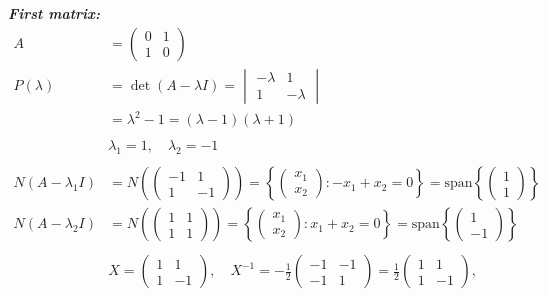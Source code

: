 \documentclass{article}
\begin{document}
\newpage
\noindent\textbf{\textit{First matrix:}}
\begin{align*}
    A &= \begin{pmatrix} 0 & 1 \\ 1 & 0 \end{pmatrix} \\
    P(\lambda) &= \det(A - \lambda I) = \begin{vmatrix} -\lambda & 1 \\ 1 & -\lambda \end{vmatrix} \\
    &= \lambda^2 - 1 = (\lambda - 1)(\lambda + 1) \\
    \\
    &\lambda_1 = 1, \quad \lambda_2 = -1 \\
    \\
    N(A - \lambda_1 I) &= N\left(\begin{pmatrix} -1 & 1 \\ 1 & -1 \end{pmatrix}\right)
    = \left\{ \begin{pmatrix} x_1 \\ x_2 \end{pmatrix} : -x_1 + x_2 = 0 \right\}
    = \text{span}\left\{ \begin{pmatrix} 1 \\ 1 \end{pmatrix} \right\} \\
    N(A - \lambda_2 I) &= N\left(\begin{pmatrix} 1 & 1 \\ 1 & 1 \end{pmatrix}\right)
    = \left\{ \begin{pmatrix} x_1 \\ x_2 \end{pmatrix} : x_1 + x_2 = 0 \right\}
    = \text{span}\left\{ \begin{pmatrix} 1 \\ -1 \end{pmatrix} \right\} \\
    \\
    &X = \begin{pmatrix} 1 & 1 \\ 1 & -1 \end{pmatrix} , \quad
    X^{-1} = -\frac{1}{2} \begin{pmatrix} -1 & -1 \\ -1 & 1 \end{pmatrix} = \frac{1}{2} \begin{pmatrix} 1 & 1 \\ 1 & -1 \end{pmatrix} , \quad

\end{align*}
\end{document}
